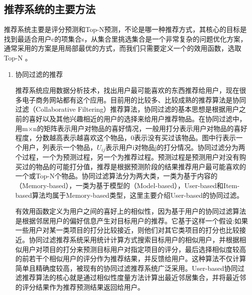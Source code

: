 		\subsection{推荐系统的主要方法}
		推荐系统主要是评分预测和Top-N预测，不论是哪一种推荐方式，其核心的目标是找到最适合用户c的项集合s，从集合里挑选集合是一个非常复杂的问题优化方案，通常采用的方案是用局部最优的方式，而我们只需要定义一个的效用函数，选取Top-N	\citep{recmd-Next}。
		\begin{enumerate}[(1)]
		\item 协同过滤的推荐

		推荐系统应用数据分析技术，找出用户最可能喜欢的东西推荐给用户，现在很多电子商务网站都有这个应用。目前用的比较多、比较成熟的推荐算法是协同过滤（Collaborative Filtering）推荐算法，协同过滤的基本思想是根据用户之前的喜好以及其他兴趣相近的用户的选择来给用户推荐物品。在协同过滤中，用m×n的矩阵表示用户对物品的喜好情况，一般用打分表示用户对物品的喜好程度，分数越高表示越喜欢这个物品，0表示没有买过该物品。图中行表示一个用户，列表示一个物品，$U_{ij}$表示用户i对物品j的打分情况。协同过滤分为两个过程，一个为预测过程，另一个为推荐过程。预测过程是预测用户对没有购买过的物品的可能打分值，推荐是根据预测阶段的结果推荐用户最可能喜欢的一个或Top-N个物品。协同过滤算法分为两大类，一类为基于内容的（Memory-based），一类为基于模型的（Model-based），User-based和Item-based算法均属于Memory-based类型\citep{Wikipedia}，这里主要介绍User-based的协同过滤。

		有效用函数定义为用户之间的喜好上的相似性，因为基于用户的协同过滤算法是根据邻居用户的偏好信息产生对目标用户的推荐。它基于这样一个假设:如果一些用户对某一类项目的打分比较接近，则他们对其它类项目的打分也比较接近。协同过滤推荐系统采用统计计算方式搜索目标用户的相似用户，并根据相似用户对项目的打分来预测目标用户对指定项目的评分，最后选择相似度较高的前若干个相似用户的评分作为推荐结果，并反馈给用户。这种算法不仅计算简单且精确度较高，被现有的协同过滤推荐系统广泛采用。User-based协同过滤推荐算法的核心就是通过相似性度量方法计算出最近邻居集合，并将最近邻的评分结果作为推荐预测结果返回给用户。


\end{enumerate}
